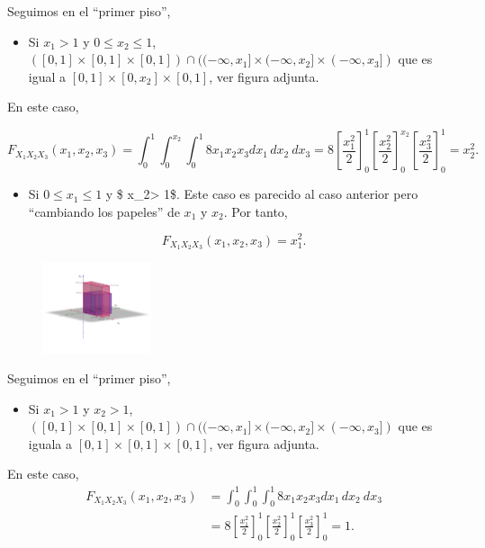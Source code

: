 \documentclass[]{book}
\providecommand{\tightlist}{%
  \setlength{\itemsep}{0pt}\setlength{\parskip}{0pt}}
\begin{document}
Seguimos en el ``primer piso'',

\begin{itemize}
\tightlist
\item
  Si \(x_1 >1\) y \(0\leq x_2\leq 1\), \(([0,1]\times [0,1]\times [0,1])\cap ((-\infty,x_1]\times (-\infty,x_2]\times (-\infty,x_3])\)
  que es igual a \([0,1]\times [0,x_2]\times [0,1]\), ver figura adjunta.
\end{itemize}

En este caso,

\[
F_{X_1X_2X_3}(x_1,x_2,x_3)=\int_{0}^{1}\int_{0}^{x_2}\int_{0}^{1} 8 x_1 x_2 x_3 dx_1\, dx_2\ dx_3 = 
8\left[\frac{x_1^2}{2}\right]_0^{1}\left[\frac{x_2^2}{2}\right]_0^{x_2}\left[\frac{x_3^2}{2}\right]_0^{1} = x_2^2.
\]

\begin{itemize}
\tightlist
\item
  Si \(0\leq x_1 \leq 1\) y \$ x\_2\textgreater{} 1\$. Este caso es parecido al caso anterior pero ``cambiando los papeles'' de \(x_1\) y \(x_2\).
  Por tanto,
\end{itemize}

\[
F_{X_1X_2X_3}(x_1,x_2,x_3)=x_1^2.
\]

\begin{figure}

{\centering \includegraphics[width=1.25in]{Images/Fx1x2x3pisox1} 

}

\end{figure}

Seguimos en el ``primer piso'',

\begin{itemize}
\tightlist
\item
  Si \(x_1>1\) y \(x_2>1\), \(([0,1]\times [0,1]\times [0,1])\cap ((-\infty,x_1]\times (-\infty,x_2]\times (-\infty,x_3])\) que es iguala a \([0,1]\times [0,1]\times [0,1]\), ver figura adjunta.
\end{itemize}

En este caso,
\[
\begin{array}{rl}
F_{X_1X_2X_3}(x_1,x_2,x_3)& =\int_{0}^{1}\int_{0}^{1}\int_{0}^{1} 8 x_1 x_2 x_3 dx_1\, dx_2\ dx_3 \\
& = 8\left[\frac{x_1^2}{2}\right]_0^{1}\left[\frac{x_2^2}{2}\right]_0^{1}\left[\frac{x_3^2}{2}\right]_0^{1} = 1.
\end{array}
\]
\end{document}
